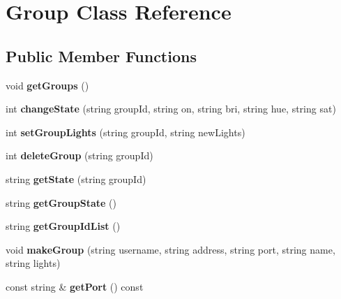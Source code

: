 \hypertarget{class_group}{}\section{Group Class Reference}
\label{class_group}
\subsection*{Public Member Functions}
\begin{DoxyCompactItemize}
\item 
\mbox{\label{class_group_a8723f9bcec8241762d7cfba60fdb5324}} 
void {\bfseries get\+Groups} ()
\item 
\mbox{\label{class_group_a78d045341cd63ec0b40970bcc5aa3135}} 
int {\bfseries change\+State} (string group\+Id, string on, string bri, string hue, string sat)
\item 
\mbox{\label{class_group_a964bd1f0b83337adbd57ab59f6d74f05}} 
int {\bfseries set\+Group\+Lights} (string group\+Id, string new\+Lights)
\item 
\mbox{\label{class_group_aaeb261e5fd93ebcb640b0bc0d3f9c24c}} 
int {\bfseries delete\+Group} (string group\+Id)
\item 
\mbox{\label{class_group_af153150353fe6dc3690b75c9a6748528}} 
string {\bfseries get\+State} (string group\+Id)
\item 
\mbox{\label{class_group_a6a405fc932a054819e8ae67cbec1537a}} 
string {\bfseries get\+Group\+State} ()
\item 
\mbox{\label{class_group_a978fe700d69f55e4d433624c4f517457}} 
string {\bfseries get\+Group\+Id\+List} ()
\item 
\mbox{\label{class_group_ad61105ec0d0d5a6322b4ba3026a011b3}} 
void {\bfseries make\+Group} (string username, string address, string port, string name, string lights)
\item 
\mbox{\label{class_group_aaf710c70c017172ea0b56eeecd33d8ec}} 
const string \& {\bfseries get\+Port} () const
\item 

\end{DoxyCompactItemize}
